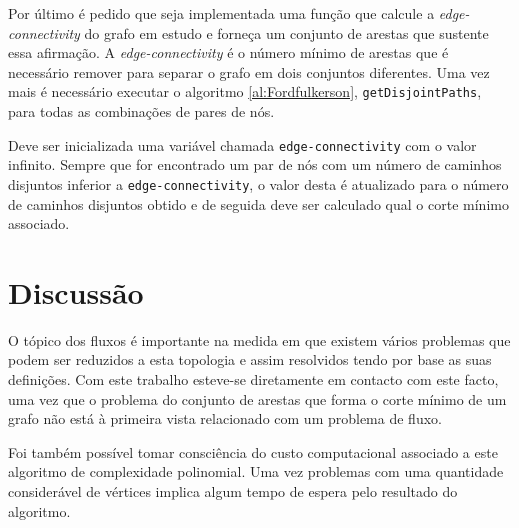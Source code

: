 \documentclass{article}
\begin{document}
Por último é pedido que seja implementada uma função que calcule a \textit{edge-connectivity} do grafo em estudo e forneça um conjunto de arestas que sustente essa afirmação. A \textit{edge-connectivity} é o número mínimo de arestas que é necessário remover para separar o grafo em dois conjuntos diferentes. Uma vez mais é necessário executar o algoritmo \ref{al:Fordfulkerson}, \texttt{getDisjointPaths}, para todas as combinações de pares de nós. 

Deve ser inicializada uma variável chamada \texttt{edge-connectivity} com o valor infinito. Sempre que for encontrado um par de nós com um número de caminhos disjuntos inferior a \texttt{edge-connectivity}, o valor desta é atualizado para o número de caminhos disjuntos obtido e de seguida deve ser calculado qual o corte mínimo associado.

\section{Discussão}

O tópico dos fluxos é importante na medida em que existem vários problemas que podem ser reduzidos a esta topologia e assim resolvidos tendo por base as suas definições. Com este trabalho esteve-se diretamente em contacto com este facto, uma vez que o problema do conjunto de arestas que forma o corte mínimo de um grafo não está à primeira vista relacionado com um problema de fluxo.

Foi também possível tomar consciência do custo computacional associado a este algoritmo de complexidade polinomial. Uma vez problemas com uma quantidade considerável de vértices implica algum tempo de espera pelo resultado do algoritmo.
\end{document}

